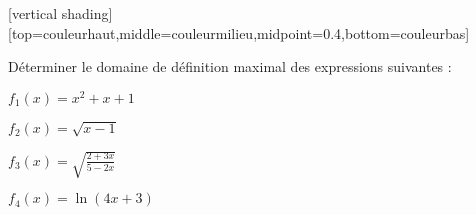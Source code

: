 










[vertical shading][top=couleurhaut,middle=couleurmilieu,midpoint=0.4,bottom=couleurbas] 



\begin{frame}

\thispagestyle{empty}    

\vfil

\Large

\center
\begin{minipage}{0.8\textwidth}
\center
\enonce
    Déterminer le domaine de définition maximal des expressions suivantes :

    \begin{examplescol}{2}
        \item $f_1(x) = x^2 +x+1$
        \item $f_2(x) = \sqrt {x-1}$
        \item $f_3(x) = \sqrt{\frac{2 + 3 x}{5-2x}}$
        \item $f_4(x) = \ln (4 x + 3)$
    \end{examplescol}
\finenonce
\end{minipage}






\end{frame}


